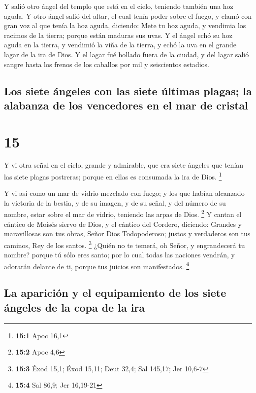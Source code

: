  Y salió otro ángel del templo que está en el cielo,
teniendo también una hoz aguda.  Y otro ángel salió del
altar, el cual tenía poder sobre el fuego, y clamó con gran voz al que
tenía la hoz aguda, diciendo: Mete tu hoz aguda, y vendimia los racimos
de la tierra; porque están maduras sus uvas.  Y el ángel
echó su hoz aguda en la tierra, y vendimió la viña de la tierra, y echó
la uva en el grande lagar de la ira de Dios.  Y el lagar
fué hollado fuera de la ciudad, y del lagar salió sangre hasta los
frenos de los caballos por mil y seiscientos estadios.

\hypertarget{los-siete-uxe1ngeles-con-las-siete-uxfaltimas-plagas-la-alabanza-de-los-vencedores-en-el-mar-de-cristal}{%
\subsection{Los siete ángeles con las siete últimas plagas; la alabanza
de los vencedores en el mar de
cristal}\label{los-siete-uxe1ngeles-con-las-siete-uxfaltimas-plagas-la-alabanza-de-los-vencedores-en-el-mar-de-cristal}}

\hypertarget{section-14}{%
\section{15}\label{section-14}}

 Y vi otra señal en el cielo, grande y admirable, que era
siete ángeles que tenían las siete plagas postreras; porque en ellas es
consumada la ira de Dios. \footnote{\textbf{15:1} Apoc 16,1}

 Y vi así como un mar de vidrio mezclado con fuego; y los
que habían alcanzado la victoria de la bestia, y de su imagen, y de su
señal, y del número de su nombre, estar sobre el mar de vidrio, teniendo
las arpas de Dios. \footnote{\textbf{15:2} Apoc 4,6}  Y
cantan el cántico de Moisés siervo de Dios, y el cántico del Cordero,
diciendo: Grandes y maravillosas son tus obras, Señor Dios Todopoderoso;
justos y verdaderos son tus caminos, Rey de los santos. \footnote{\textbf{15:3}
  Éxod 15,1; Éxod 15,11; Deut 32,4; Sal 145,17; Jer 10,6-7} 
¿Quién no te temerá, oh Señor, y engrandecerá tu nombre? porque tú sólo
eres santo; por lo cual todas las naciones vendrán, y adorarán delante
de ti, porque tus juicios son manifestados. \footnote{\textbf{15:4} Sal
  86,9; Jer 16,19-21}

\hypertarget{la-apariciuxf3n-y-el-equipamiento-de-los-siete-uxe1ngeles-de-la-copa-de-la-ira}{%
\subsection{La aparición y el equipamiento de los siete ángeles de la
copa de la
ira}\label{la-apariciuxf3n-y-el-equipamiento-de-los-siete-uxe1ngeles-de-la-copa-de-la-ira}}

